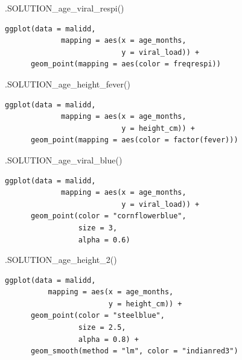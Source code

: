 \documentclass[
  letterpaper,
  DIV=11,
  numbers=noendperiod]{scrreprt}
\newenvironment{Shaded}{\begin{snugshade}}{\end{snugshade}}
\newcommand{\FunctionTok}[1]{\textcolor[rgb]{0.28,0.35,0.67}{#1}}
\newcommand{\NormalTok}[1]{\textcolor[rgb]{0.00,0.23,0.31}{#1}}
\begin{document}
\begin{Shaded}
\begin{Highlighting}[]
\FunctionTok{.SOLUTION\_age\_viral\_respi}\NormalTok{() }
\end{Highlighting}
\end{Shaded}

\begin{verbatim}
ggplot(data = malidd, 
             mapping = aes(x = age_months, 
                           y = viral_load)) + 
      geom_point(mapping = aes(color = freqrespi))
\end{verbatim}

\begin{Shaded}
\begin{Highlighting}[]
\FunctionTok{.SOLUTION\_age\_height\_fever}\NormalTok{()}
\end{Highlighting}
\end{Shaded}

\begin{verbatim}
ggplot(data = malidd, 
             mapping = aes(x = age_months, 
                           y = height_cm)) + 
      geom_point(mapping = aes(color = factor(fever)))
\end{verbatim}

\begin{Shaded}
\begin{Highlighting}[]
\FunctionTok{.SOLUTION\_age\_viral\_blue}\NormalTok{()}
\end{Highlighting}
\end{Shaded}

\begin{verbatim}
ggplot(data = malidd, 
             mapping = aes(x = age_months, 
                           y = viral_load)) + 
      geom_point(color = "cornflowerblue",
                 size = 3,
                 alpha = 0.6)
\end{verbatim}

\begin{Shaded}
\begin{Highlighting}[]
\FunctionTok{.SOLUTION\_age\_height\_2}\NormalTok{()}
\end{Highlighting}
\end{Shaded}

\begin{verbatim}
ggplot(data = malidd, 
          mapping = aes(x = age_months, 
                        y = height_cm)) + 
      geom_point(color = "steelblue",
                 size = 2.5,
                 alpha = 0.8) +
      geom_smooth(method = "lm", color = "indianred3")
\end{verbatim}
\end{document}
